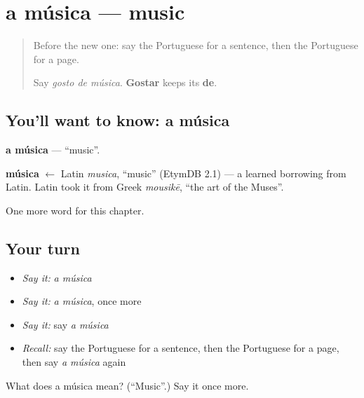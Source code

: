 \section[a música]{a música — music}

\label{lesson:PT-C114-musica}



\begin{quote}
Before the new one: say the Portuguese for a sentence, then the Portuguese for a page.

Say \emph{gosto de música}. \textbf{Gostar} keeps its \textbf{de}.
\end{quote}

\subsection*{You'll want to know: a música}
\textbf{a música} — \textquotedblleft{}music\textquotedblright{}.

\begin{cousinweb}
\textbf{música} $\leftarrow$ Latin \emph{musica}, \textquotedblleft{}music\textquotedblright{} (EtymDB 2.1) — a learned borrowing from Latin. Latin took it from Greek \emph{mousikē}, \textquotedblleft{}the art of the Muses\textquotedblright{}.
\end{cousinweb}

\begin{grammarlens}[title={What you've built}]
One more word for this chapter.
\end{grammarlens}

\subsection*{Your turn}
\begin{itemize}
\raggedright
  \item \emph{Say it:} \emph{a música}
  \item \emph{Say it:} \emph{a música}, once more
  \item \emph{Say it:} say \emph{a música}
  \item \emph{Recall:} say the Portuguese for a sentence, then the Portuguese for a page, then say \emph{a música} again
\end{itemize}

\begin{tcolorbox}[breakable,colback=teal!4,colframe=teal!35!black,title={Before you move on}]
What does a música mean? (\textquotedblleft{}Music\textquotedblright{}.) Say it once more.
\end{tcolorbox}
